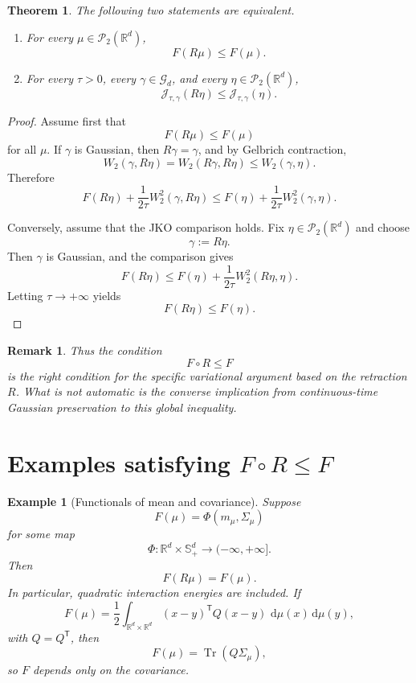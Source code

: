 \documentclass[11pt]{article}
\newtheorem{theorem}{Theorem}
\newtheorem{example}{Example}
\newtheorem{remark}{Remark}
\DeclareMathOperator{\Tr}{Tr}
\newcommand{\R}{\mathbb R}
\newcommand{\W}{W}
\newcommand{\dd}{\,\mathrm d}
\begin{document}
\begin{theorem}
The following two statements are equivalent.

\begin{enumerate}
\item For every $\mu\in\mathcal P_2(\R^d)$,
\[
F(R\mu)\le F(\mu).
\]

\item For every $\tau>0$, every $\gamma\in\mathcal G_d$, and every
$\eta\in\mathcal P_2(\R^d)$,
\[
\mathcal J_{\tau,\gamma}(R\eta)
\le
\mathcal J_{\tau,\gamma}(\eta).
\]
\end{enumerate}
\end{theorem}

\begin{proof}
Assume first that
\[
F(R\mu)\le F(\mu)
\]
for all $\mu$. If $\gamma$ is Gaussian, then $R\gamma=\gamma$, and by Gelbrich
contraction,
\[
\W_2(\gamma,R\eta)
=
\W_2(R\gamma,R\eta)
\le
\W_2(\gamma,\eta).
\]
Therefore
\[
F(R\eta)+\frac{1}{2\tau}\W_2^2(\gamma,R\eta)
\le
F(\eta)+\frac{1}{2\tau}\W_2^2(\gamma,\eta).
\]

Conversely, assume that the JKO comparison holds. Fix
$\eta\in\mathcal P_2(\R^d)$ and choose
\[
\gamma:=R\eta.
\]
Then $\gamma$ is Gaussian, and the comparison gives
\[
F(R\eta)
\le
F(\eta)+\frac{1}{2\tau}\W_2^2(R\eta,\eta).
\]
Letting $\tau\to+\infty$ yields
\[
F(R\eta)\le F(\eta).
\]
\end{proof}

\begin{remark}
Thus the condition
\[
F\circ R\le F
\]
is the right condition for the specific variational argument based on the
retraction $R$. What is not automatic is the converse implication from
continuous-time Gaussian preservation to this global inequality.
\end{remark}

\section{Examples satisfying \(F\circ R\le F\)}

\begin{example}[Functionals of mean and covariance]
Suppose
\[
F(\mu)=\Phi(m_\mu,\Sigma_\mu)
\]
for some map
\[
\Phi:\R^d\times\mathbb S_+^d\to(-\infty,+\infty].
\]
Then
\[
F(R\mu)=F(\mu).
\]
In particular, quadratic interaction energies are included. If
\[
F(\mu)
=
\frac12\int_{\R^d\times\R^d}
(x-y)^{\mathsf T}Q(x-y)\,\dd\mu(x)\dd\mu(y),
\]
with $Q=Q^{\mathsf T}$, then
\[
F(\mu)=\Tr(Q\Sigma_\mu),
\]
so $F$ depends only on the covariance.
\end{example}
\end{document}

